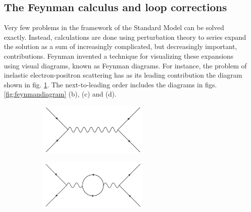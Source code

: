 \subsection{The Feynman calculus and loop corrections}
\label{subsec:feynmancalculus}
Very few problems in the framework of the Standard Model can be solved exactly. Instead, calculations are done using perturbation theory to series expand the solution as a sum of increasingly complicated, but decreasingly important, contributions. Feynman invented a technique for visualizing these expansions using visual diagrams, known as Feynman diagrams. For instance, the problem of inelastic electron-positron scattering has as its leading contribution the diagram shown in fig. \ref{fig:feynmandiagram_a}. The next-to-leading order includes the diagrams in figs. \ref{fig:feynmandiagram} (b), (c) and (d).
\begin{figure}[htbp]
	\centering
	\begin{subfigure}[b]{0.45\textwidth}
		\centering
		\includegraphics[width=0.6\textwidth]{figures/susyintro/epscattering.pdf}
		\caption{ }
		\label{fig:feynmandiagram_a}
	\end{subfigure}
	\begin{subfigure}[b]{0.45\textwidth}
		\centering
		\includegraphics[width=0.6\textwidth]{figures/susyintro/epscattering_fermionloop.pdf}
		\caption{ }
		\label{fig:feynmandiagram_b}
	\end{subfigure}


\end{figure}
